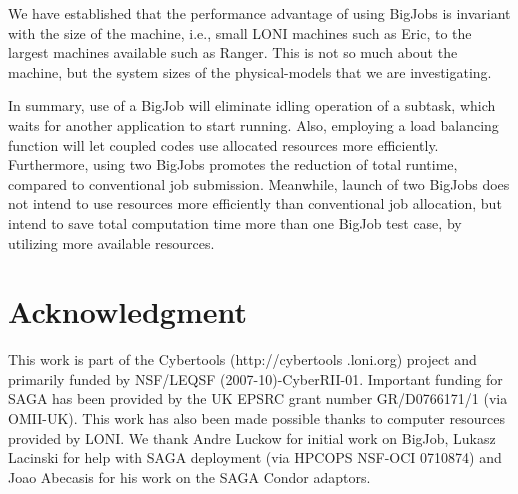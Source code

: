 \documentclass[conference,final]{IEEEtran}
\newcommand{\jhanote}[1]{ {\textcolor{red} { ***Jha: #1 }}}
\newcommand{\jhanote}[1]{}
\begin{document}
We have established that the performance advantage of using BigJobs is
invariant with the size of the machine, i.e., small LONI machines such
as Eric, to the largest machines available such as Ranger. This is not
so much about the machine, but the system sizes of the physical-models
that we are investigating.

In summary, use of a BigJob will eliminate idling operation of a
subtask, which waits for another application to start running. Also,
employing a load balancing function will let coupled codes use
allocated resources more efficiently. Furthermore, using two BigJobs
promotes the reduction of total runtime, compared to conventional job
submission. Meanwhile, launch of two BigJobs does not intend to use
resources more efficiently than conventional job allocation, but
intend to save total computation time more than one BigJob test case,
by utilizing more available resources.



\section*{Acknowledgment}
This work is part of the Cybertools (http://cybertools .loni.org)
project and primarily funded by NSF/LEQSF (2007-10)-CyberRII-01.
Important funding for SAGA has been provided by the UK EPSRC grant
number GR/D0766171/1 (via OMII-UK). This work has also been made
possible thanks to computer resources provided by LONI. We thank Andre
Luckow for initial work on BigJob, Lukasz Lacinski for help with SAGA
deployment (via HPCOPS NSF-OCI 0710874) and Joao Abecasis for his work
on the SAGA Condor adaptors.

\nocite{ex1,ex2}
%


\end{document}
